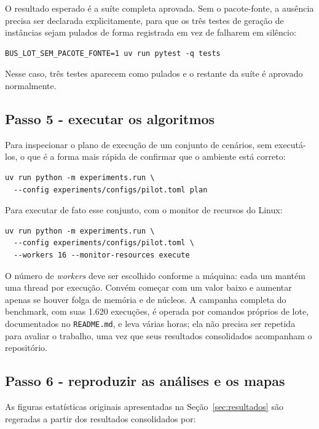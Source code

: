 \documentclass[12pt,a4paper]{article}
\begin{document}
O resultado esperado é a suíte completa aprovada. Sem o pacote-fonte, a
ausência precisa ser declarada explicitamente, para que os três testes de
geração de instâncias sejam pulados de forma registrada em vez de
falharem em silêncio:

\begin{verbatim}
BUS_LOT_SEM_PACOTE_FONTE=1 uv run pytest -q tests
\end{verbatim}

Nesse caso, três testes aparecem como pulados e o restante da suíte é
aprovado normalmente.

\subsection{Passo 5 - executar os algoritmos}

Para inspecionar o plano de execução de um conjunto de cenários, sem
executá-los, o que é a forma mais rápida de confirmar que o ambiente está
correto:

\begin{verbatim}
uv run python -m experiments.run \
  --config experiments/configs/pilot.toml plan
\end{verbatim}

Para executar de fato esse conjunto, com o monitor de recursos do Linux:

\begin{verbatim}
uv run python -m experiments.run \
  --config experiments/configs/pilot.toml \
  --workers 16 --monitor-resources execute
\end{verbatim}

O número de \emph{workers} deve ser escolhido conforme a máquina: cada um
mantém uma thread por execução. Convém começar com um valor baixo e
aumentar apenas se houver folga de memória e de núcleos. A campanha
completa do benchmark, com suas 1.620 execuções, é operada por comandos
próprios de lote, documentados no \texttt{README.md}, e leva várias
horas; ela não precisa ser repetida para avaliar o trabalho, uma vez que
seus resultados consolidados acompanham o repositório.

\subsection{Passo 6 - reproduzir as análises e os mapas}

As figuras estatísticas originais apresentadas na Seção~\ref{sec:resultados} são regeradas
a partir dos resultados consolidados por:
\end{document}
